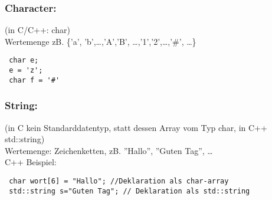 \subsubsection{Character:} (in C/C++: char) \\
 Wertemenge zB. \{'a', 'b',\dots,'A','B', \dots,'1','2',\dots,'\#', \dots\}
 \begin{lstlisting}
 char e;
 e = 'z';
 char f = '#'
 \end{lstlisting}
 
 \subsubsection{String:} (in C kein Standarddatentyp, statt dessen Array vom Typ char, in C++ std::string) \\
 Wertemenge: Zeichenketten, zB. ''Hallo'', ''Guten Tag'', \dots \\
 C++ Beispiel:
 \begin{lstlisting}
 char wort[6] = "Hallo"; //Deklaration als char-array
 std::string s="Guten Tag"; // Deklaration als std::string
 \end{lstlisting}
 

